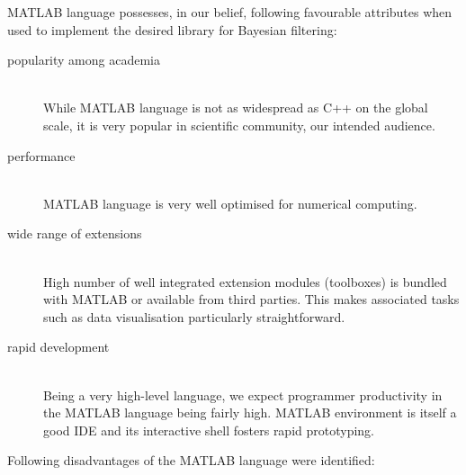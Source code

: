 MATLAB language possesses, in our belief, following favourable attributes when used to implement the
desired library for Bayesian filtering:
\begin{description}
	\item[popularity among academia] \hfill \\
		While MATLAB language is not as widespread as C++ on the global scale, it is very popular in
		scientific community, our intended audience.
	\item[performance] \hfill \\
		MATLAB language is very well optimised for numerical computing.
	\item[wide range of extensions] \hfill \\
		High number of well integrated extension modules (toolboxes) is bundled with MATLAB or
		available from third parties. This makes associated tasks such as data visualisation
		particularly straightforward.
	\item[rapid development] \hfill \\
		Being a very high-level language, we expect programmer productivity in the MATLAB language being
		fairly high. MATLAB environment is itself a good IDE and its interactive shell fosters rapid
		prototyping.
\end{description}
Following disadvantages of the MATLAB language were identified:
